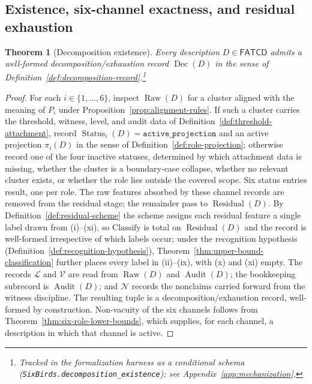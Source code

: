 \documentclass[11pt]{article}
\newtheorem{theorem}{Theorem}[section]
\theoremstyle{definition}
\newcommand{\FATCD}{\ensuremath{\mathsf{FATCD}}}
\newcommand{\Raw}[1]{\ensuremath{\operatorname{Raw}\!\left(#1\right)}}
\newcommand{\Audit}[1]{\ensuremath{\operatorname{Audit}\!\left(#1\right)}}
\newcommand{\Dec}[1]{\ensuremath{\operatorname{Dec}\!\left(#1\right)}}
\newcommand{\Residual}[1]{\ensuremath{\operatorname{Residual}\!\left(#1\right)}}
\newcommand{\Status}[2]{\ensuremath{\operatorname{Status}_{#1}\!\left(#2\right)}}
\newcommand{\activeproj}{\texttt{active\_projection}}
\begin{document}
\subsection{Existence, six-channel exactness, and residual exhaustion}\label{subsec:dec-theorems}

\begin{theorem}[Decomposition existence]\label{thm:decomposition-existence}
Every description \(D \in \FATCD{}\) admits a well-formed decomposition/exhaustion
record \(\Dec{D}\) in the sense of
Definition~\ref{def:decomposition-record}.\footnote{Tracked in the formalization harness as a conditional schema (\texttt{SixBirds.decomposition\_existence}); see Appendix~\ref{app:mechanization}.}
\end{theorem}

\begin{proof}
For each \(i \in \{1,\ldots,6\}\), inspect \(\Raw{D}\) for a cluster
aligned with the meaning of \(P_i\) under
Proposition~\ref{prop:alignment-rules}. If such a cluster carries the
threshold, witness, level, and audit data of
Definition~\ref{def:threshold-attachment}, record
\(\Status{i}{D} = \activeproj\) and an active projection
\(\pi_i(D)\) in the sense of Definition~\ref{def:role-projection};
otherwise record one of the four inactive statuses, determined by
which attachment data is missing, whether the cluster is a
boundary-case collapse, whether no relevant cluster exists, or
whether the role lies outside the covered scope. Six status entries
result, one per role. The raw features absorbed by these channel
records are removed from the residual stage; the remainder pass to
\(\Residual{D}\). By Definition~\ref{def:residual-scheme} the scheme assigns
each residual feature a single label drawn from (i)--(xi), so
\(\mathrm{Classify}\) is total on \(\Residual{D}\) and the record is well-formed
irrespective of which labels occur; under the recognition hypothesis
(Definition~\ref{def:recognition-hypothesis}),
Theorem~\ref{thm:upper-bound-classification} further places every label in
(ii)--(ix), with (x) and (xi) empty. The records \(\mathcal{L}\) and \(\mathcal{V}\) are
read from \(\Raw{D}\) and \(\Audit{D}\); the bookkeeping subrecord is
\(\Audit{D}\); and \(\mathcal{N}\) records the nonclaims carried
forward from the witness discipline. The resulting tuple is a
decomposition/exhaustion record, well-formed by construction.
Non-vacuity of the six channels follows from
Theorem~\ref{thm:six-role-lower-bounds}, which supplies, for each
channel, a description in which that channel is active.
\end{proof}
\end{document}
